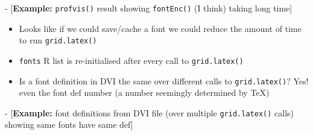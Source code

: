 \documentclass[]{article}
\begin{document}
- {[}\textbf{Example:} \texttt{profvis()} result showing
\texttt{fontEnc()} (I think) taking long time{]}

\begin{itemize}
\item
  Looks like if we could save/cache a font we could reduce the amount of
  time to run \texttt{grid.latex()}
\item
  \texttt{fonts} R list is re-initialised after every call to
  \texttt{grid.latex()}
\item
  Is a font definition in DVI the same over different calls to
  \texttt{grid.latex()}? Yes! even the font def number (a number
  seemingly determined by TeX)
\end{itemize}

- {[}\textbf{Example:} font definitions from DVI file (over multiple
\texttt{grid.latex()} calls) showing same fonts have same def{]}
\end{document}
